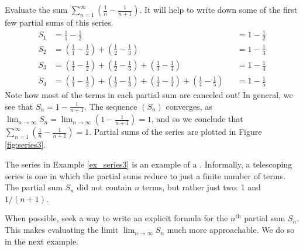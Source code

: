\documentclass{ximera}
\begin{document}
\begin{example}
Evaluate the sum $\sum_{n=1}^\infty \left(\frac1n-\frac1{n+1}\right)$.
It will help to write down some of the first few partial sums of this series.
\begin{align*}
S_1 &=	\frac11-\frac12 & & = 1-\frac12\\
S_2 &=	\left(\frac11-\frac12\right) + \left(\frac12-\frac13\right) & & = 1-\frac13\\
S_3 &=	\left(\frac11-\frac12\right) + \left(\frac12-\frac13\right)+\left(\frac13-\frac14\right) & &= 1-\frac14\\
S_4 &=	\left(\frac11-\frac12\right) + \left(\frac12-\frac13\right)+\left(\frac13-\frac14\right) +\left(\frac14-\frac15\right)& &= 1-\frac15
\end{align*}
Note how most of the terms in each partial sum are canceled out! In
general, we see that $S_n = 1-\frac{1}{n+1}$. The sequence $(S_n)$
converges, as $\lim_{n\to\infty}S_n =
\lim_{n\to\infty}\left(1-\frac1{n+1}\right) = 1$, and so we conclude
that $\sum_{n=1}^\infty \left(\frac1n-\frac1{n+1}\right) = 1$. Partial
sums of the series are plotted in Figure \ref{fig:series3}.
\end{example}

The series in Example \ref{ex_series3} is an example of a . Informally, a telescoping series is one in which the partial sums reduce to just a finite number of terms. The partial sum $S_n$ did not contain $n$ terms, but rather just two: 1 and $1/(n+1)$.

When possible, seek a way to write an explicit formula for the $n^\text{th}$ partial sum $S_n$. This makes evaluating the limit $\lim_{n\to\infty} S_n$ much more approachable. We do so in the next example.\\

\end{document}
